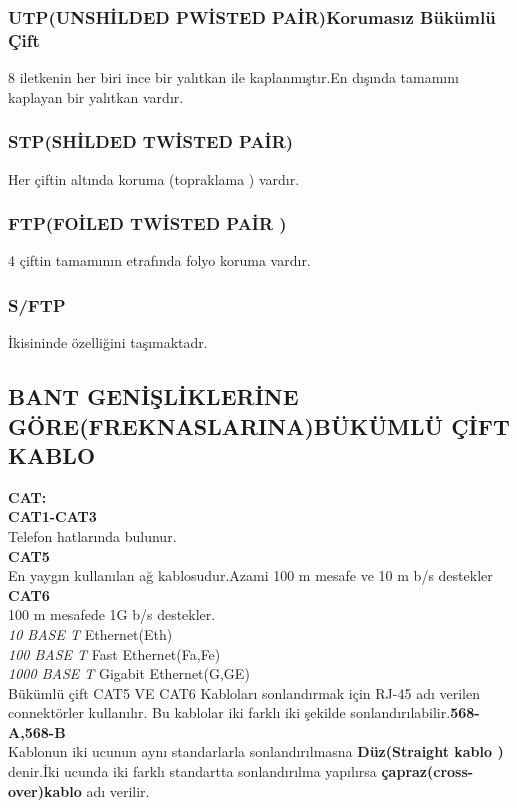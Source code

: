\subsubsection{UTP(UNSHİLDED PWİSTED PAİR)Korumasız Bükümlü Çift} 
    8 iletkenin her biri ince bir yalıtkan ile kaplanmıştır.En dışında tamamını kaplayan bir yalıtkan vardır.
\subsubsection{STP(SHİLDED TWİSTED PAİR)} 
Her çiftin altında koruma (topraklama ) vardır.
\subsubsection{FTP(FOİLED TWİSTED PAİR )} 
4 çiftin tamamının etrafında folyo koruma vardır.
\subsubsection {S/FTP }
İkisininde özelliğini taşımaktadr.
    
\subsection{BANT GENİŞLİKLERİNE GÖRE(FREKNASLARINA)BÜKÜMLÜ ÇİFT KABLO}
\textbf{CAT:}\\
\textbf{CAT1-CAT3} \\
Telefon hatlarında bulunur.\\
\textbf{CAT5} \\
En yaygın kullanılan ağ kablosudur.Azami 100 m mesafe ve 10 m b/s destekler\\
\textbf{CAT6} \\
100 m mesafede 1G b/s destekler.\\
\textit{10 BASE T} Ethernet(Eth)\\
\textit{100 BASE T} Fast Ethernet(Fa,Fe)\\
\textit{1000 BASE T} Gigabit Ethernet(G,GE)\\
Bükümlü çift CAT5 VE CAT6 Kabloları  sonlandırmak için RJ-45 adı verilen connektörler kullanılır.
Bu kablolar iki farklı iki şekilde sonlandırılabilir.\textbf{568-A,568-B}\\
Kablonun iki ucunun aynı standarlarla sonlandırılmasna \textbf{Düz(Straight kablo )} denir.İki ucunda iki farklı standartta sonlandırılma yapılırsa \textbf{çapraz(cross-over)kablo } adı verilir.